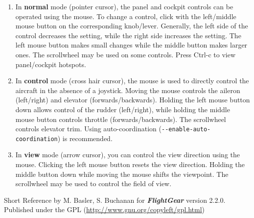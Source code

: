 \documentclass[10pt]{article}
\newcommand{\FlightGear}{{\itshape\bfseries FlightGear}}
\newcommand{\web}[1]{\href{#1}{#1}}
\begin{document}
 \begin{enumerate}
 \item In \textbf{normal} mode (pointer cursor), the panel and cockpit controls can be
 operated using the mouse. To change a control, click with the left/middle mouse button
 on the corresponding knob/lever. Generally, the left side of the control decreases the setting,
 while the right side increases the setting. The left mouse button makes small changes while the
 middle button makes larger ones. The scrollwheel may be used on some controls.
 Press Ctrl-c to view panel/cockpit hotspots.

 \item In \textbf{control} mode (cross hair cursor), the mouse is used to directly control
 the aircraft in the absence of a joystick. Moving the mouse controls the aileron (left/right)
 and elevator (forwards/backwards). Holding the left mouse button down allows control of the rudder (left/right), while holding the middle mouse button controls throttle (forwards/backwards). The scrollwheel controls
 elevator trim. Using auto-coordination (\texttt{-$ $-enable-auto-coordination}) is recommended.

 \item In \textbf{view} mode (arrow cursor), you can control the view direction using the mouse.
 Clicking the left mouse button resets the view direction. Holding the middle button down while
 moving the mouse shifts the viewpoint. The scrollwheel may be used to control the field of view.

\end{enumerate}

 \noindent
 Short Reference by M. Basler, S. Buchanan for \FlightGear{} version 2.2.0.\\
 Published under the GPL (\web{http://www.gnu.org/copyleft/gpl.html})
\end{document}
